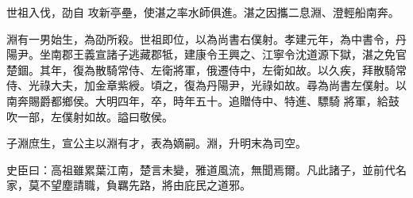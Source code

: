 \begin{pinyinscope}
 世祖入伐，劭自
 攻新亭壘，使湛之率水師俱進。湛之因攜二息淵、澄輕船南奔。



 淵有一男始生，為劭所殺。世祖即位，以為尚書右僕射。孝建元年，為中書令，丹陽尹。坐南郡王義宣諸子逃藏郡牴，建康令王興之、江寧令沈道源下獄，湛之免官楚錮。其年，復為散騎常侍、左衛將軍，俄遷侍中，左衛如故。以久疾，拜散騎常侍、光祿大夫，加金章紫綬。頃之，復為丹陽尹，光祿如故。尋為尚書左僕射。以南奔賜爵都鄉侯。大明四年，卒，時年五十。追贈侍中、特進、驃騎
 將軍，給鼓吹一部，左僕射如故。謚曰敬侯。



 子淵庶生，宣公主以淵有才，表為嫡嗣。淵，升明末為司空。



 史臣曰：高祖雖累葉江南，楚言未變，雅道風流，無聞焉爾。凡此諸子，並前代名家，莫不望塵請職，負羈先路，將由庇民之道邪。



\end{pinyinscope}